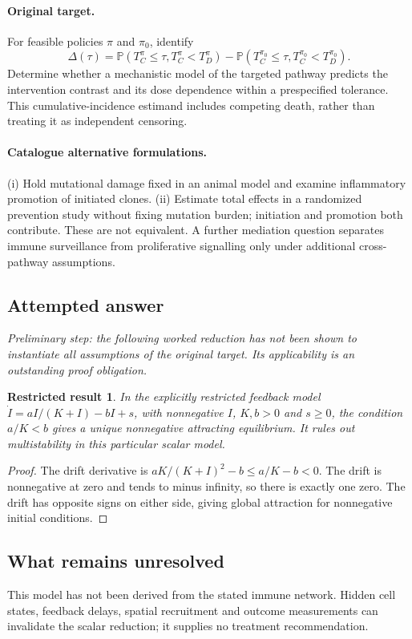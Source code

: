 \documentclass[11pt]{article}
\newcommand{\Prob}{\mathbb P}
\providecommand{\Prob}{\mathbb P}
\newtheorem{attemptresult}{Restricted result}[section]
\begin{document}
\paragraph{Original target.}
For feasible policies $\pi$ and $\pi_0$, identify
\[
\Delta(\tau)=\Prob(T_C^{\pi}\leq\tau,T_C^{\pi}<T_D^{\pi})
-\Prob(T_C^{\pi_0}\leq\tau,T_C^{\pi_0}<T_D^{\pi_0}).
\]
Determine whether a mechanistic model of the targeted pathway predicts the intervention contrast and its dose dependence within a prespecified tolerance. This cumulative-incidence estimand includes competing death, rather than treating it as independent censoring.
\paragraph{Catalogue alternative formulations.}
(i) Hold mutational damage fixed in an animal model and examine inflammatory promotion of initiated clones. (ii) Estimate total effects in a randomized prevention study without fixing mutation burden; initiation and promotion both contribute. These are not equivalent. A further mediation question separates immune surveillance from proliferative signalling only under additional cross-pathway assumptions.
\subsection{Attempted answer}
\noindent\emph{Preliminary step: the following worked reduction has not been shown to instantiate all assumptions of the original target. Its applicability is an outstanding proof obligation.}

\begin{attemptresult}
In the explicitly restricted feedback model $\dot I=aI/(K+I)-bI+s$, with nonnegative $I$, $K,b>0$ and $s\geq0$, the condition $a/K<b$ gives a unique nonnegative attracting equilibrium. It rules out multistability in this particular scalar model.
\end{attemptresult}
\begin{proof}
The drift derivative is $aK/(K+I)^2-b\leq a/K-b<0$. The drift is nonnegative at zero and tends to minus infinity, so there is exactly one zero. The drift has opposite signs on either side, giving global attraction for nonnegative initial conditions.
\end{proof}
\subsection{What remains unresolved}
This model has not been derived from the stated immune network. Hidden cell states, feedback delays, spatial recruitment and outcome measurements can invalidate the scalar reduction; it supplies no treatment recommendation.
\end{document}
